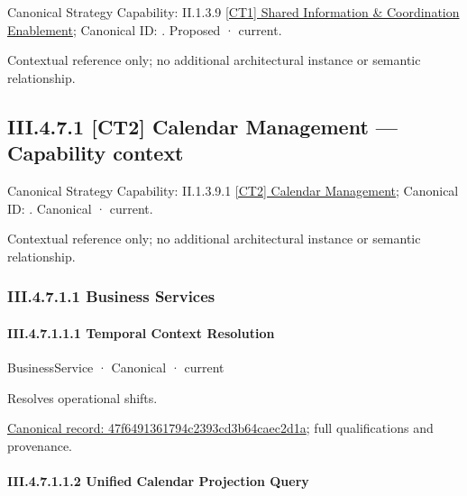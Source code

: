 {\small Canonical Strategy Capability: II.1.3.9 \hyperref[element:0062fcacae1740988b6be2bda2aa1674]{[CT1] Shared Information \& Coordination Enablement}; Canonical ID: \texttt{}. Proposed · current.}\par
Contextual reference only; no additional architectural instance or semantic relationship.\par
\subsection*{III.4.7.1 [CT2] Calendar Management — Capability context}
\label{navigation:III.4.7.1}

{\small Canonical Strategy Capability: II.1.3.9.1 \hyperref[element:7669036f7e6749219412fc64df5f7064]{[CT2] Calendar Management}; Canonical ID: \texttt{}. Canonical · current.}\par
Contextual reference only; no additional architectural instance or semantic relationship.\par
\subsubsection*{III.4.7.1.1 Business Services}
\label{navigation:III.4.7.1.1}

\paragraph*{III.4.7.1.1.1 Temporal Context Resolution}
\label{navigation:III.4.7.1.1.1}

\label{element:47f6491361794c2393cd3b64caec2d1a}
{\small BusinessService · Canonical · current}\par

Resolves operational shifts.


{\footnotesize \href{../../../../continuum/business/business-service/47f6491361794c2393cd3b64caec2d1a.md}{Canonical record: 47f6491361794c2393cd3b64caec2d1a}; full qualifications and provenance.}\par
\paragraph*{III.4.7.1.1.2 Unified Calendar Projection Query}
\label{navigation:III.4.7.1.1.2}

